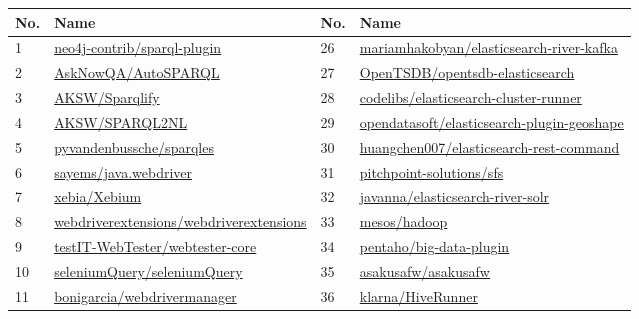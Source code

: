 \begin{table}[!h]
	\footnotesize
	\centering
	\begin{tabular}{|p{0.80cm}|p{6.0cm}|p{0.80cm}|p{6.0cm}|}  \hline
		{\bf No.} & {\bf Name} & {\bf No.} & {\bf Name} \\  \hline
		1 & \href{https://github.com/neo4j-contrib/sparql-plugin}{neo4j-contrib/sparql-plugin}  & 26 & \href{https://github.com/mariamhakobyan/elasticsearch-river-kafka}{mariamhakobyan/elasticsearch-river-kafka} \\ \hline
		2 & \href{https://github.com/AskNowQA/AutoSPARQL}{AskNowQA/AutoSPARQL} & 27 & \href{https://github.com/OpenTSDB/opentsdb-elasticsearch}{OpenTSDB/opentsdb-elasticsearch} \\ \hline
		3 & \href{https://github.com/AKSW/Sparqlify}{AKSW/Sparqlify} & 28 & \href{https://github.com/codelibs/elasticsearch-cluster-runner}{codelibs/elasticsearch-cluster-runner} \\ \hline
		4 & \href{https://github.com/AKSW/SPARQL2NL}{AKSW/SPARQL2NL} & 29 & \href{https://github.com/opendatasoft/elasticsearch-plugin-geoshape}{opendatasoft/elasticsearch-plugin-geoshape} \\ \hline 
		5 & \href{https://github.com/pyvandenbussche/sparqles}{pyvandenbussche/sparqles} & 30 &  \href{https://github.com/huangchen007/elasticsearch-rest-command}{huangchen007/elasticsearch-rest-command} \\ \hline
		6 & \href{https://github.com/sayems/java.webdriver}{sayems/java.webdriver} & 31 & \href{https://github.com/pitchpoint-solutions/sfs}{pitchpoint-solutions/sfs} \\ \hline
		7 & \href{https://github.com/xebia/Xebium}{xebia/Xebium} & 32 & \href{https://github.com/javanna/elasticsearch-river-solr}{javanna/elasticsearch-river-solr} \\ \hline
		8 & \href{https://github.com/webdriverextensions/webdriverextensions}{webdriverextensions/webdriverextensions} & 33 & \href{https://github.com/mesos/hadoop}{mesos/hadoop} \\ \hline
		9 & \href{https://github.com/testIT-WebTester/webtester-core}{testIT-WebTester/webtester-core} & 34 & \href{https://github.com/pentaho/big-data-plugin}{pentaho/big-data-plugin} \\ \hline
		10 & \href{https://github.com/seleniumQuery/seleniumQuery}{seleniumQuery/seleniumQuery} & 35 & \href{https://github.com/asakusafw/asakusafw}{asakusafw/asakusafw} \\ \hline
		11 & \href{https://github.com/bonigarcia/webdrivermanager}{bonigarcia/webdrivermanager} & 36 & \href{https://github.com/klarna/HiveRunner}{klarna/HiveRunner} \\ \hline

\end{tabular}
\end{table}
